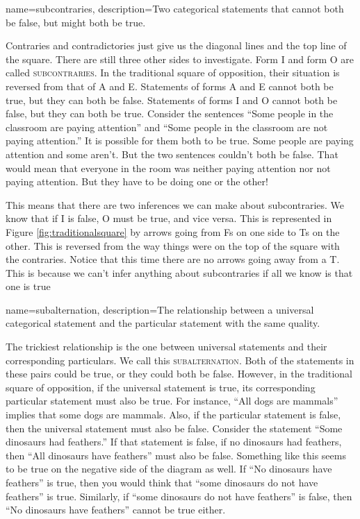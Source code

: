 {
name=subcontraries,
description={Two categorical statements that cannot both be false, but might both be true.}
}

Contraries and contradictories just give us the diagonal lines and the top line of the square. There are still three other sides to investigate. Form I and form O are called \textsc{\gls{subcontraries}}. \label{defSubcontraries} In the traditional square of opposition, their situation is reversed from that of A and E. Statements of forms A and E cannot both be true, but they can both be false. Statements of forms I and O cannot both be false, but they can both be true. Consider the sentences ``Some people in the classroom are paying attention'' and ``Some people in the classroom are not paying attention.'' It is possible for them both to be true. Some people are paying attention and some aren't. But the two sentences couldn't both be false. That would mean that everyone in the room was neither paying attention nor not paying attention. But they have to be doing one or the other!

This means that there are two inferences we can make about subcontraries. We know that if I is false, O must be true, and vice versa. This is represented in Figure \ref{fig:traditionalsquare} by arrows going from Fs on one side to Ts on the other. This is reversed from the way things were on the top of the square with the contraries. Notice that this time there are no arrows going away from a T. This is because we can't infer anything about subcontraries if all we know is that one is true

{
name=subalternation,
description={The relationship between a universal categorical statement and the particular statement with the same quality.}
}


The trickiest relationship is the one between universal statements and their corresponding particulars. We call this \textsc{\gls{subalternation}}. Both of the statements in these pairs could be true, or they could both be false. However, in the traditional square of opposition, if the universal statement is true, its corresponding particular statement must also be true. For instance, ``All dogs are mammals'' implies that some dogs are mammals. Also, if the particular statement is false, then the universal statement must also be false. Consider the statement ``Some dinosaurs had feathers.'' If that statement is false, if no dinosaurs had feathers, then ``All dinosaurs have feathers'' must also be false. Something like this seems to be true on the negative side of the diagram as well. If ``No dinosaurs have feathers'' is true, then you would think that ``some dinosaurs do not have feathers'' is true. Similarly, if ``some dinosaurs do not have feathers'' is false, then ``No dinosaurs have feathers'' cannot be true either. 


